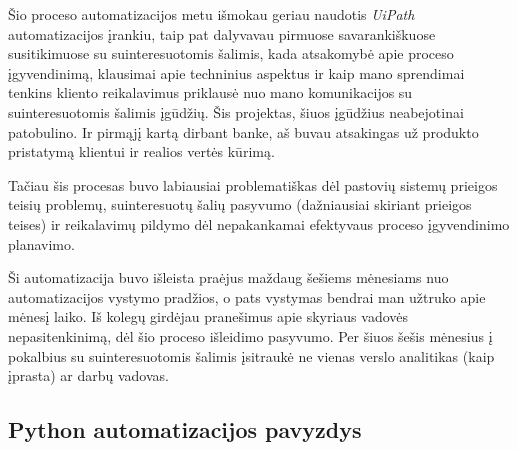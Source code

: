 \documentclass{VUMIFPSBakPrakAt}
\begin{document}
\vspace{10pt}
\par
Šio proceso automatizacijos metu išmokau geriau naudotis \textit{UiPath} automatizacijos įrankiu, taip pat dalyvavau pirmuose savarankiškuose susitikimuose su suinteresuotomis šalimis, kada atsakomybė apie proceso įgyvendinimą, klausimai apie techninius aspektus ir kaip mano sprendimai tenkins kliento reikalavimus priklausė nuo mano komunikacijos su suinteresuotomis šalimis įgūdžių. Šis projektas, šiuos įgūdžius neabejotinai patobulino. Ir pirmąjį kartą dirbant banke, aš buvau atsakingas už produkto pristatymą klientui ir realios vertės kūrimą.
\par
Tačiau šis procesas buvo labiausiai problematiškas dėl pastovių sistemų prieigos teisių problemų, suinteresuotų šalių pasyvumo (dažniausiai skiriant prieigos teises) ir reikalavimų pildymo dėl nepakankamai efektyvaus proceso įgyvendinimo planavimo.
\par
Ši automatizacija buvo išleista praėjus maždaug šešiems mėnesiams nuo automatizacijos vystymo pradžios, o pats vystymas bendrai man užtruko apie mėnesį laiko. Iš kolegų girdėjau pranešimus apie skyriaus vadovės nepasitenkinimą, dėl šio proceso išleidimo pasyvumo. Per šiuos šešis mėnesius į pokalbius su suinteresuotomis šalimis įsitraukė ne vienas verslo analitikas (kaip įprasta) ar darbų vadovas.

\subsection{Python automatizacijos pavyzdys}
\end{document}
